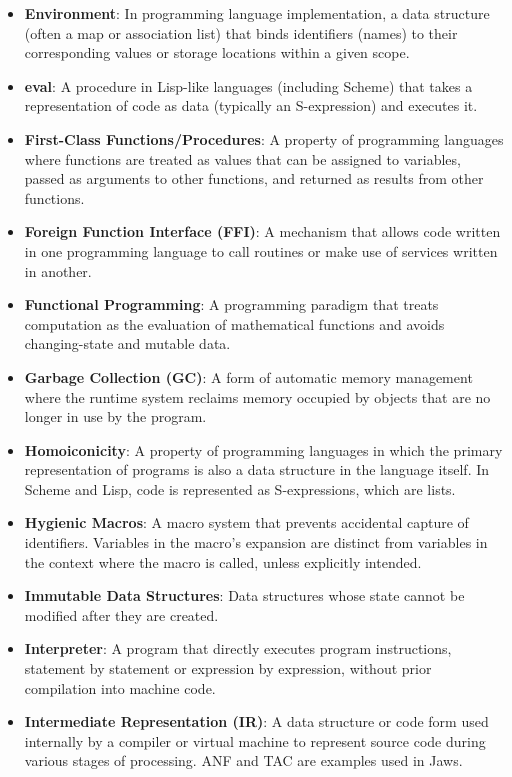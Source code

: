 \documentclass[final]{cmpreport_02}
\begin{document}
\begin{itemize}
    \item \textbf{Environment}: In programming language implementation, a data structure (often a map or association list) that binds identifiers (names) to their corresponding values or storage locations within a given scope.
    \item \textbf{eval}: A procedure in Lisp-like languages (including Scheme) that takes a representation of code as data (typically an S-expression) and executes it.
    \item \textbf{First-Class Functions/Procedures}: A property of programming languages where functions are treated as values that can be assigned to variables, passed as arguments to other functions, and returned as results from other functions.
    \item \textbf{Foreign Function Interface (FFI)}: A mechanism that allows code written in one programming language to call routines or make use of services written in another.
    \item \textbf{Functional Programming}: A programming paradigm that treats computation as the evaluation of mathematical functions and avoids changing-state and mutable data.
    \item \textbf{Garbage Collection (GC)}: A form of automatic memory management where the runtime system reclaims memory occupied by objects that are no longer in use by the program.
    \item \textbf{Homoiconicity}: A property of programming languages in which the primary representation of programs is also a data structure in the language itself. In Scheme and Lisp, code is represented as S-expressions, which are lists.
    \item \textbf{Hygienic Macros}: A macro system that prevents accidental capture of identifiers. Variables in the macro's expansion are distinct from variables in the context where the macro is called, unless explicitly intended.
    \item \textbf{Immutable Data Structures}: Data structures whose state cannot be modified after they are created.
    \item \textbf{Interpreter}: A program that directly executes program instructions, statement by statement or expression by expression, without prior compilation into machine code.
    \item \textbf{Intermediate Representation (IR)}: A data structure or code form used internally by a compiler or virtual machine to represent source code during various stages of processing. ANF and TAC are examples used in Jaws.

\end{itemize}
\end{document}
